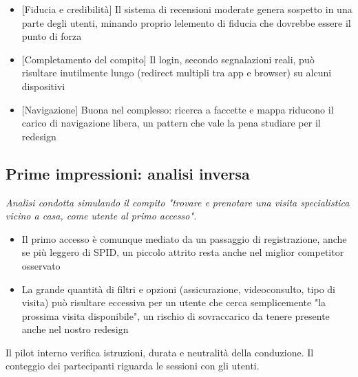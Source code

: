 
\begin{itemize}
\item
  {[}Fiducia e credibilità{]} Il sistema di recensioni moderate genera
  sospetto in una parte degli utenti, minando proprio
  l\textquotesingle elemento di fiducia che dovrebbe essere il punto di
  forza
\item
  {[}Completamento del compito{]} Il login, secondo segnalazioni reali, può
  risultare inutilmente lungo (redirect multipli tra app e browser) su
  alcuni dispositivi
\item
  {[}Navigazione{]} Buona nel complesso: ricerca a faccette e mappa
  riducono il carico di navigazione libera, un pattern che vale la pena
  studiare per il redesign
\end{itemize}

\subsection[Analisi inversa]{Prime impressioni: analisi inversa}

\emph{Analisi condotta simulando il compito "trovare e prenotare una visita
specialistica vicino a casa, come utente al primo accesso".}


\begin{itemize}
\item
  Il primo accesso è comunque mediato da un passaggio di registrazione,
  anche se più leggero di SPID, un piccolo attrito resta anche nel
  miglior competitor osservato
\item
  La grande quantità di filtri e opzioni (assicurazione, videoconsulto,
  tipo di visita) può risultare eccessiva per un utente che cerca
  semplicemente "la prossima visita disponibile", un rischio di
  sovraccarico da tenere presente anche nel nostro redesign
\end{itemize}

\label{doc:a:06}


Il pilot interno verifica istruzioni, durata e neutralità della conduzione.
Il conteggio dei partecipanti riguarda le sessioni con gli utenti.


